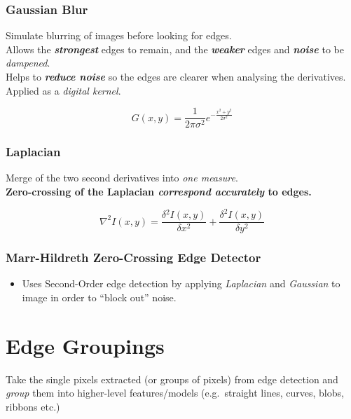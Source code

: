 \documentclass[english, 10pt]{article}
\begin{document}
\subsubsection{Gaussian Blur}
Simulate blurring of images before looking for edges. \\

Allows the \textbf{\emph{strongest}} edges to remain, and the \textbf{\emph{weaker}} edges and \textbf{\emph{noise}} to be \emph{dampened}. \\

Helps to \textbf{\emph{reduce noise}} so the edges are clearer when analysing the derivatives. \\

Applied as a \emph{digital kernel}.

$$ G(x, y) = \frac{1}{2\pi\sigma^2}e^{-\frac{x^2+y^2}{2\sigma^2}}$$

\subsubsection{Laplacian}

Merge of the two second derivatives into \emph{one measure}. \\

\textbf{Zero-crossing of the Laplacian \emph{correspond accurately} to edges.}

$$ \nabla ^2I(x, y) = \frac{\delta {^2}I(x, y)}{\delta x^2} + \frac{\delta ^2I(x, y)}{\delta y^2}$$

\subsubsection{Marr-Hildreth Zero-Crossing Edge
Detector}\label{marr-hildreth-zero-crossing-edge-detector}

\begin{itemize}
\itemsep1pt\parskip0pt
\item
  Uses Second-Order edge detection by applying \emph{Laplacian} and
  \emph{Gaussian} to image in order to ``block out'' noise.
\end{itemize}
      
\section{Edge Groupings}\label{edge-groupings}

  Take the single pixels extracted (or groups of pixels) from edge
  detection and \emph{group} them into higher-level features/models
  (e.g.~straight lines, curves, blobs, ribbons etc.) \\
\end{document}
